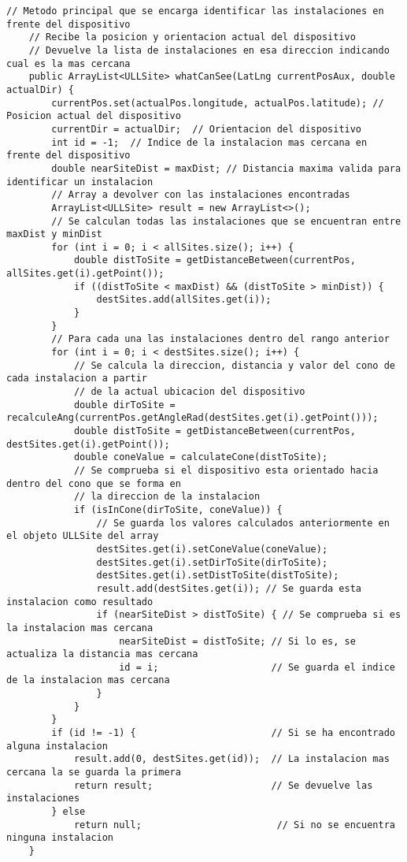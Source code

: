 \begin{lstlisting}[caption={Método principal que realiza el cálculo que permite reconocer las instalaciones que se hallan frente al dispositivo móvil.}, label={lst:whatCanSee}]
    // Metodo principal que se encarga identificar las instalaciones en frente del dispositivo
    // Recibe la posicion y orientacion actual del dispositivo
    // Devuelve la lista de instalaciones en esa direccion indicando cual es la mas cercana 
    public ArrayList<ULLSite> whatCanSee(LatLng currentPosAux, double actualDir) {
        currentPos.set(actualPos.longitude, actualPos.latitude); // Posicion actual del dispositivo
        currentDir = actualDir;  // Orientacion del dispositivo
        int id = -1;  // Indice de la instalacion mas cercana en frente del dispositivo
        double nearSiteDist = maxDist; // Distancia maxima valida para identificar un instalacion
        // Array a devolver con las instalaciones encontradas
        ArrayList<ULLSite> result = new ArrayList<>(); 
        // Se calculan todas las instalaciones que se encuentran entre maxDist y minDist
        for (int i = 0; i < allSites.size(); i++) {
            double distToSite = getDistanceBetween(currentPos, allSites.get(i).getPoint());
            if ((distToSite < maxDist) && (distToSite > minDist)) {
                destSites.add(allSites.get(i));
            }
        }
        // Para cada una las instalaciones dentro del rango anterior 
        for (int i = 0; i < destSites.size(); i++) {  
            // Se calcula la direccion, distancia y valor del cono de cada instalacion a partir 
            // de la actual ubicacion del dispositivo
            double dirToSite = recalculeAng(currentPos.getAngleRad(destSites.get(i).getPoint()));
            double distToSite = getDistanceBetween(currentPos, destSites.get(i).getPoint());
            double coneValue = calculateCone(distToSite);
            // Se comprueba si el dispositivo esta orientado hacia dentro del cono que se forma en  
            // la direccion de la instalacion
            if (isInCone(dirToSite, coneValue)) { 
                // Se guarda los valores calculados anteriormente en el objeto ULLSite del array
                destSites.get(i).setConeValue(coneValue); 
                destSites.get(i).setDirToSite(dirToSite); 
                destSites.get(i).setDistToSite(distToSite); 
                result.add(destSites.get(i)); // Se guarda esta instalacion como resultado
                if (nearSiteDist > distToSite) { // Se comprueba si es la instalacion mas cercana
                    nearSiteDist = distToSite; // Si lo es, se actualiza la distancia mas cercana
                    id = i;                    // Se guarda el indice de la instalacion mas cercana
                }
            }
        }
        if (id != -1) {                        // Si se ha encontrado alguna instalacion
            result.add(0, destSites.get(id));  // La instalacion mas cercana la se guarda la primera
            return result;                     // Se devuelve las instalaciones                   
        } else
            return null;                        // Si no se encuentra ninguna instalacion
    }
\end{lstlisting}


